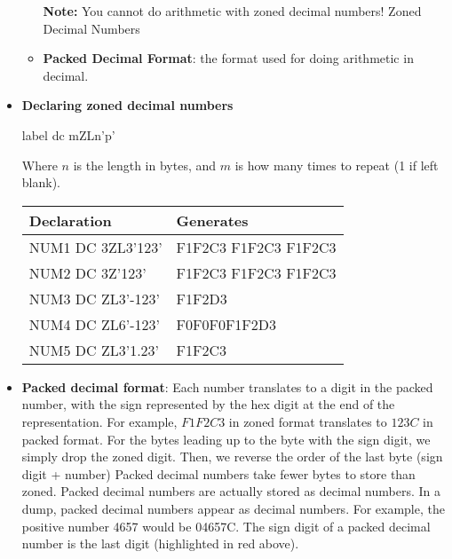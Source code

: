 \documentclass{report}
\begin{document}
\begin{itemize}
\begin{itemize}
                    \textbf{Note:} You cannot do arithmetic with zoned decimal numbers! Zoned Decimal Numbers
                \item \textbf{Packed Decimal Format}: the format used for doing arithmetic in decimal.
            \end{itemize}
        \item \textbf{Declaring zoned decimal numbers}
            \bigbreak \noindent 
            \begin{cppcode}
            label    dc    mZLn'p'
            \end{cppcode}
            \bigbreak \noindent 
            Where $n$ is the length in bytes, and $m$ is how many times to repeat (1 if left blank).
            \bigbreak \noindent 
            \begin{center}
                \begin{tabular}{p{4cm}|p{4cm}}
                    Declaration &Generates\\
                    \hline
                    NUM1 DC 3ZL3'123' &F1F2C3 F1F2C3 F1F2C3 \\
                    NUM2 DC 3Z'123' &F1F2C3 F1F2C3 F1F2C3 \\
                    NUM3 DC ZL3'-123' &F1F2D3 \\
                    NUM4 DC ZL6'-123' &F0F0F0F1F2D3 \\
                    NUM5 DC ZL3'1.23' &F1F2C3
                \end{tabular}
            \end{center}
        \item \textbf{Packed decimal format}: Each number translates to a digit in the packed number, with the sign represented by the hex digit at the end of the representation. 
            \bigbreak \noindent 
            For example, $F1F2C3$ in zoned format translates to $123C$ in packed format. For the bytes leading up to the byte with the sign digit, we simply drop the zoned digit. Then, we reverse the order of the last byte (sign digit + number)
            \bigbreak \noindent 
            Packed decimal numbers take fewer bytes to store than zoned. Packed decimal numbers are actually stored as decimal numbers.
            \bigbreak \noindent 
            In a dump, packed decimal numbers appear as decimal numbers.
            \bigbreak \noindent 
            For example, the positive number 4657 would be 04657C. The sign digit of a packed decimal number is the last digit (highlighted in red above).
            \bigbreak \noindent 

\end{itemize}
\end{document}
